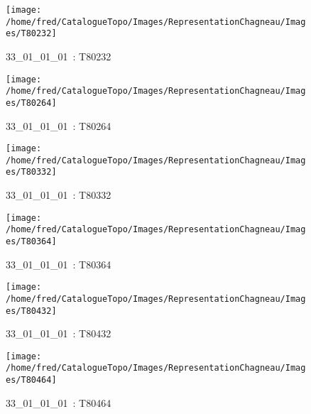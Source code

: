 \documentclass[12pt,titlepage,oneside]{book}
\begin{document}
\begin{figure}[h!]
\begin{minipage}[t]{3cm}
\begin{center}
      \texttt{[image: /home/fred/CatalogueTopo/Images/RepresentationChagneau/Images/T80232]}
      \caption[~33\_01\_01\_01]{\small{33\_01\_01\_01~:} \tiny{T80232}}\label{T80232}
    \end{center}
  \end{minipage}
  \begin{minipage}[t]{3cm}
    \begin{center}
      \texttt{[image: /home/fred/CatalogueTopo/Images/RepresentationChagneau/Images/T80264]}
      \caption[~33\_01\_01\_01]{\small{33\_01\_01\_01~:} \tiny{T80264}}\label{T80264}
    \end{center}
  \end{minipage}
  \begin{minipage}[t]{3cm}
    \begin{center}
      \texttt{[image: /home/fred/CatalogueTopo/Images/RepresentationChagneau/Images/T80332]}
      \caption[~33\_01\_01\_01]{\small{33\_01\_01\_01~:} \tiny{T80332}}\label{T80332}
    \end{center}
  \end{minipage}
  \begin{minipage}[t]{3cm}
    \begin{center}
      \texttt{[image: /home/fred/CatalogueTopo/Images/RepresentationChagneau/Images/T80364]}
      \caption[~33\_01\_01\_01]{\small{33\_01\_01\_01~:} \tiny{T80364}}\label{T80364}
    \end{center}
  \end{minipage}
  \begin{minipage}[t]{3cm}
    \begin{center}
      \texttt{[image: /home/fred/CatalogueTopo/Images/RepresentationChagneau/Images/T80432]}
      \caption[~33\_01\_01\_01]{\small{33\_01\_01\_01~:} \tiny{T80432}}\label{T80432}
    \end{center}
  \end{minipage}
  \begin{minipage}[t]{3cm}
    \begin{center}
      \texttt{[image: /home/fred/CatalogueTopo/Images/RepresentationChagneau/Images/T80464]}
      \caption[~33\_01\_01\_01]{\small{33\_01\_01\_01~:} \tiny{T80464}}\label{T80464}

\end{center}
\end{minipage}
\end{figure}
\end{document}
